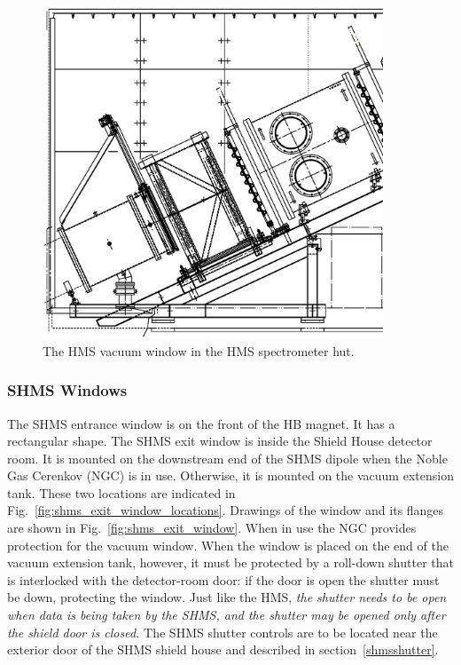 {\begin{figure}
\begin{center}
\includegraphics[width=4in]{figHMShut}
\caption{The HMS vacuum window in the HMS spectrometer hut.
\label{fig:hms_window2}}
\end{center}
\end{figure}

\subsubsection{SHMS Windows}
\label{sec:shmswindows}
The SHMS entrance window is on the front of the HB magnet. It has a rectangular shape.
The SHMS exit window is inside the Shield House detector room. It is mounted on the
downstream end of the SHMS dipole when the Noble Gas Cerenkov (NGC)
is in use. Otherwise, it is mounted on the vacuum extension tank.  These two locations
are indicated in Fig.~\ref{fig:shms_exit_window_locations}.  Drawings of
the window and its flanges are shown in Fig.~\ref{fig:shms_exit_window}. When in use
the NGC provides protection for the vacuum window. When the window is placed on
the end of the vacuum extension tank, however, it must be protected by a roll-down
shutter that is interlocked with the detector-room door: if the door is open the shutter
must be down, protecting the window. Just like the HMS, \emph{the shutter needs to be
open when data is being taken by the SHMS, and the shutter may be opened only
after the shield door is closed.} The SHMS shutter controls are to be located near the
exterior door of the SHMS shield house and described in section~\ref{shmsshutter}.

}
